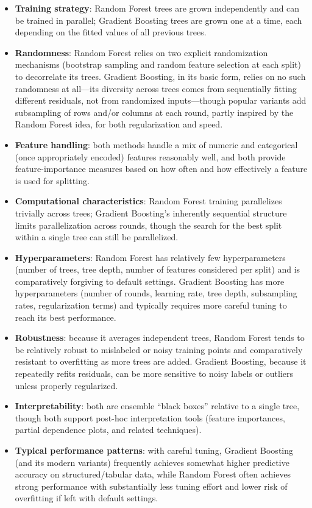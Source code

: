 \documentclass[12pt,a4paper]{article}
\begin{document}
\begin{itemize}
    \item \textbf{Training strategy}: Random Forest trees are grown independently and can be trained in parallel; Gradient Boosting trees are grown one at a time, each depending on the fitted values of all previous trees.
    \item \textbf{Randomness}: Random Forest relies on two explicit randomization mechanisms (bootstrap sampling and random feature selection at each split) to decorrelate its trees. Gradient Boosting, in its basic form, relies on no such randomness at all---its diversity across trees comes from sequentially fitting different residuals, not from randomized inputs---though popular variants add subsampling of rows and/or columns at each round, partly inspired by the Random Forest idea, for both regularization and speed.
    \item \textbf{Feature handling}: both methods handle a mix of numeric and categorical (once appropriately encoded) features reasonably well, and both provide feature-importance measures based on how often and how effectively a feature is used for splitting.
    \item \textbf{Computational characteristics}: Random Forest training parallelizes trivially across trees; Gradient Boosting's inherently sequential structure limits parallelization across rounds, though the search for the best split within a single tree can still be parallelized.
    \item \textbf{Hyperparameters}: Random Forest has relatively few hyperparameters (number of trees, tree depth, number of features considered per split) and is comparatively forgiving to default settings. Gradient Boosting has more hyperparameters (number of rounds, learning rate, tree depth, subsampling rates, regularization terms) and typically requires more careful tuning to reach its best performance.
    \item \textbf{Robustness}: because it averages independent trees, Random Forest tends to be relatively robust to mislabeled or noisy training points and comparatively resistant to overfitting as more trees are added. Gradient Boosting, because it repeatedly refits residuals, can be more sensitive to noisy labels or outliers unless properly regularized.
    \item \textbf{Interpretability}: both are ensemble ``black boxes'' relative to a single tree, though both support post-hoc interpretation tools (feature importances, partial dependence plots, and related techniques).
    \item \textbf{Typical performance patterns}: with careful tuning, Gradient Boosting (and its modern variants) frequently achieves somewhat higher predictive accuracy on structured/tabular data, while Random Forest often achieves strong performance with substantially less tuning effort and lower risk of overfitting if left with default settings.
\end{itemize}
\end{document}
